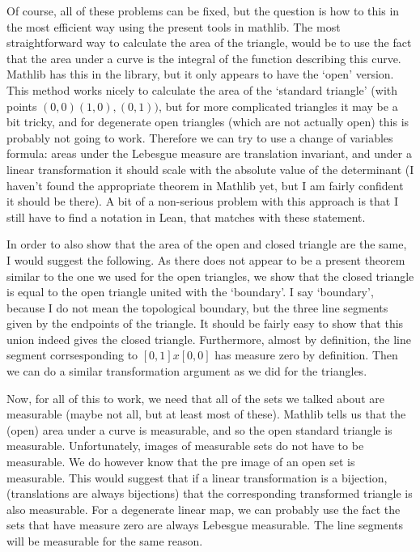 Of course, all of these problems can be fixed, but the question is how to this in the most efficient
way using the present tools in mathlib. The most straightforward way to calculate the area of the
triangle, would be to use the fact that the area under a curve is the integral of the function
describing this curve. Mathlib has this in the library, but it only appears to have the `open' version.
This method works nicely to calculate the area of the `standard triangle' (with points $(0,0)(1,0),(0,1))$,
but for more complicated triangles it may be a bit tricky, and for degenerate open triangles
(which are not actually open) this is probably not going to work. Therefore we can try to use a
change of variables formula: areas under the Lebesgue measure are translation invariant, and under
a linear transformation it should scale with the absolute value of the determinant (I haven't found
the appropriate theorem in Mathlib yet, but I am fairly confident it should be there).
A bit of a non-serious problem with this approach is that I still have to find a notation in Lean,
that matches with these statement.

In order to also show that the area of the open and closed triangle are the same, I would suggest
the following. As there does not appear to be a present theorem similar to the one we used for
the open triangles, we show that the closed triangle is equal to the open triangle united with the
`boundary'. I say `boundary', because I do not mean the topological boundary, but the three
line segments given by the endpoints of the triangle. It should be fairly easy to show that this
union indeed gives the closed triangle. Furthermore, almost by definition, the line segment
corrsesponding to $[0,1]x[0,0]$ has measure zero by definition. Then we can do a similar transformation
argument as we did for the triangles.

Now, for all of this to work, we need that all of the sets we talked about are measurable (maybe not
all, but at least most of these). Mathlib tells us that the (open) area under a curve is measurable,
and so the open standard triangle is measurable. Unfortunately, images of measurable sets do not
have to be measurable. We do however know that the pre image of an open set is measurable. This
would suggest that if a linear transformation is a bijection, (translations are always bijections)
that the corresponding transformed triangle is also measurable. For a degenerate linear map, we can
probably use the fact the sets that have measure zero are always Lebesgue measurable. The line segments
will be measurable for the same reason.

